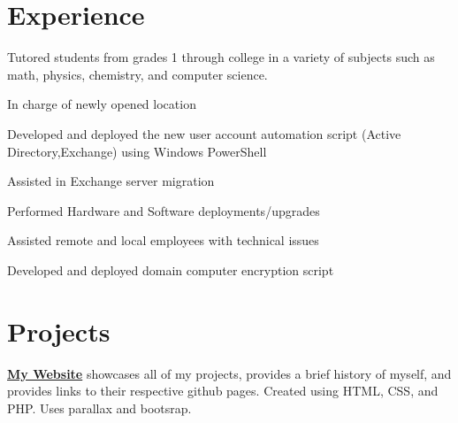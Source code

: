 \documentclass[]{DavidTsenterResume}
\begin{document}
\begin{minipage}[t]{0.66\textwidth} 


\section{Experience}

\vspace{\topsep} %
\begin{tightemize}
\item Tutored students from grades 1 through college in a variety of subjects such as
math, physics, chemistry, and computer science.
\item In charge of newly opened location
\end{tightemize}
\sectionsep


\begin{tightemize}\item Developed and deployed the new user account automation script (Active Directory,Exchange) using Windows PowerShell
\item Assisted in Exchange server migration
\end{tightemize}
\sectionsep

\begin{tightemize}
\item Performed Hardware and Software deployments/upgrades
\item Assisted remote and local employees with technical issues 
\item Developed and deployed domain computer encryption script

\end{tightemize}
\sectionsep




\section{Projects}
 \textbf{\href{http://davidtsenter.com}{My Website}} showcases all of my projects, provides a brief history of myself, and provides links to their respective github pages. Created using HTML, CSS, and PHP. Uses parallax and bootsrap.
\sectionsep


\end{minipage}
\end{document}
